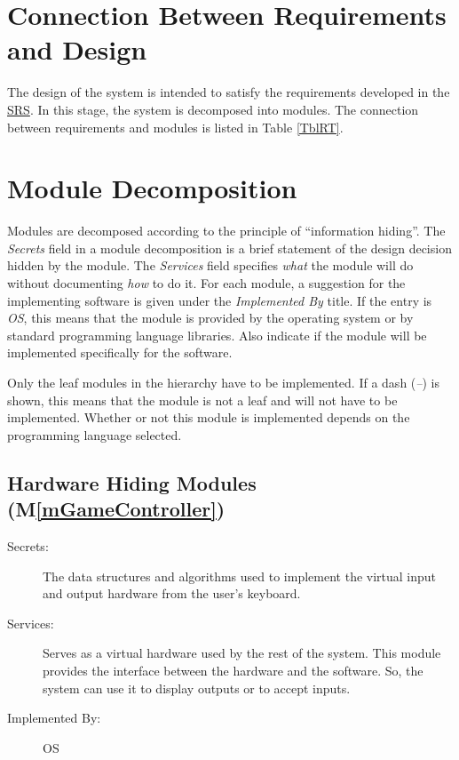 \documentclass[12pt, titlepage]{article}
\newcommand{\mref}[1]{M\ref{#1}}
\begin{document}
\section{Connection Between Requirements and Design} \label{SecConnection}

The design of the system is intended to satisfy the requirements developed in
the \href{https://gitlab.cas.mcmaster.ca/jandric/super-refactored-mario-bros/-/blob/master/Doc/SRS/SRS.pdf}{SRS}. In this stage, the system is decomposed into modules. The connection between requirements and modules is listed in Table \ref{TblRT}.

\section{Module Decomposition} \label{SecMD}

Modules are decomposed according to the principle of ``information hiding''. The \emph{Secrets} field in a module
decomposition is a brief statement of the design decision hidden by the
module. The \emph{Services} field specifies \emph{what} the module will do
without documenting \emph{how} to do it. For each module, a suggestion for the
implementing software is given under the \emph{Implemented By} title. If the
entry is \emph{OS}, this means that the module is provided by the operating
system or by standard programming language libraries.  Also indicate if the
module will be implemented specifically for the software.

Only the leaf modules in the
hierarchy have to be implemented. If a dash (\emph{--}) is shown, this means
that the module is not a leaf and will not have to be implemented. Whether or
not this module is implemented depends on the programming language
selected.

\subsection{Hardware Hiding Modules (\mref{mGameController})}

\begin{description}
\item[Secrets:]The data structures and algorithms used to implement the virtual input and output
  hardware from the user's keyboard.
\item[Services:]Serves as a virtual hardware used by the rest of the
  system. This module provides the interface between the hardware and the
  software. So, the system can use it to display outputs or to accept inputs.
\item[Implemented By:] OS
\end{description}
\end{document}
